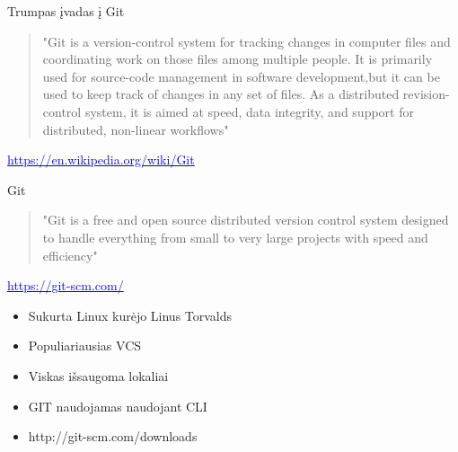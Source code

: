 \documentclass[11pt,xcolor=table]{beamer}
\begin{document}
\begin{frame}{Trumpas įvadas į Git}
\begin{quote}
"Git is a version-control system for tracking changes in computer files and coordinating work on those files among multiple people. It is primarily used for source-code management in software development,but it can be used to keep track of changes in any set of files. As a distributed revision-control system, it is aimed at speed, data integrity, and support for distributed, non-linear workflows"
\end{quote}
\href{https://en.wikipedia.org/wiki/Git}{\textcolor{blue}{https://en.wikipedia.org/wiki/Git}}
\end{frame}
\begin{frame}{Git}
\begin{quote}
"Git is a free and open source distributed version control system designed to handle everything from small to very large projects with speed and efficiency"
\end{quote}
\href{https://git-scm.com/}{\textcolor{blue}{https://git-scm.com/}}
\begin{itemize}
\item Sukurta Linux kurėjo Linus Torvalds
\item Populiariausias VCS
\item Viskas išsaugoma lokaliai
\item GIT naudojamas naudojant CLI
\item http://git-scm.com/downloads
\end{itemize}
\end{frame}
\end{document}
